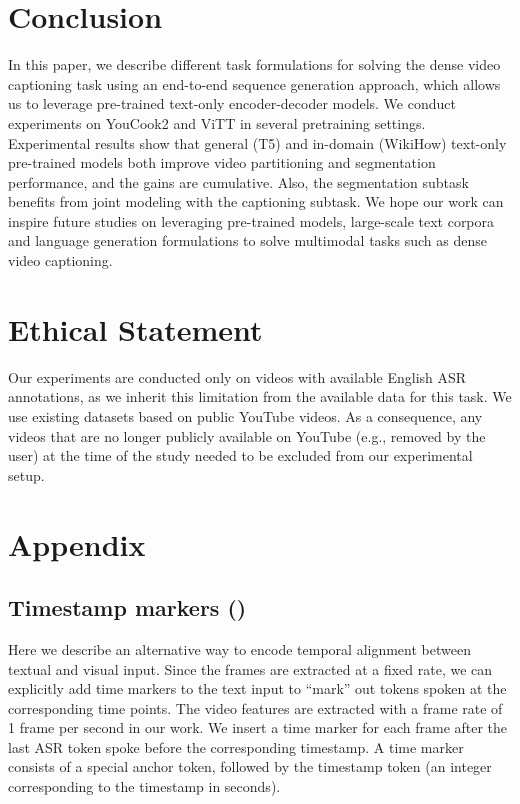 \documentclass[11pt]{article}
\begin{document}
 \section{Conclusion}

In this paper, we describe different task formulations for solving the dense video captioning task using an end-to-end sequence generation approach, which allows us to leverage pre-trained text-only encoder-decoder models. 
We conduct experiments on YouCook2 and ViTT in several pretraining settings.
Experimental results show that general (T5) and in-domain (WikiHow) text-only pre-trained models both improve video partitioning and segmentation performance, and the gains are cumulative.
Also, the segmentation subtask benefits from joint modeling with the captioning subtask.
We hope our work can inspire future studies on leveraging pre-trained models, large-scale text corpora and language generation formulations to solve multimodal tasks such as dense video captioning.




\section*{Ethical Statement}
Our experiments are conducted only on videos with available English ASR annotations, as we inherit this limitation from the available data for this task.
We use existing datasets based on public YouTube videos.
As a consequence, any videos that are no longer publicly available on YouTube (e.g., removed by the user) at the time of the study needed to be excluded from our experimental setup.
%
 







\clearpage

\appendix


\section{Appendix}
\label{sec:appendix}

\subsection{Timestamp markers (\timeanchorShort)}
\label{sec:appendix:markers}

Here we describe an alternative way to encode temporal alignment between textual and visual input.
Since the frames are extracted at a fixed rate,  we can explicitly add time markers to the text input to ``mark'' out tokens spoken at the corresponding time points.
The video features are extracted with a frame rate of 1 frame per second in our work.  
We insert a time marker for each frame after the last ASR token spoke before the corresponding timestamp. A time marker consists of a special anchor token, followed by the timestamp token (an integer corresponding to the timestamp in seconds).
\end{document}

